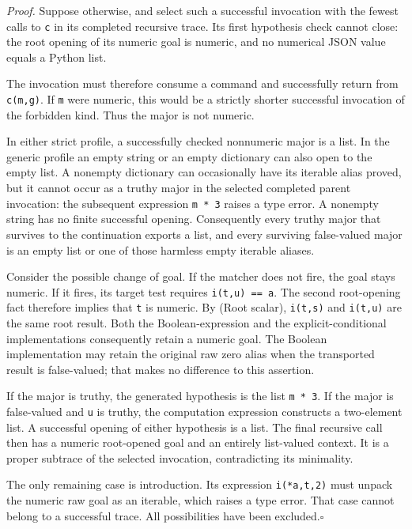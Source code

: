 \emph{Proof.}
Suppose otherwise, and select such a successful invocation with the
fewest calls to \texttt{c} in its completed recursive trace.  Its first
hypothesis check cannot close: the root opening of its numeric goal is
numeric, and no numerical JSON value equals a Python list.

The invocation must therefore consume a command and successfully return
from \texttt{c(m,g)}.  If \texttt{m} were numeric, this would be a
strictly shorter successful invocation of the forbidden kind.  Thus the
major is not numeric.

In either strict profile, a successfully checked nonnumeric major is a
list.  In the generic profile an empty string or an empty dictionary can
also open to the empty list.  A nonempty dictionary can occasionally
have its iterable alias proved, but it cannot occur as a truthy major
in the selected completed parent invocation: the subsequent expression
\texttt{m * 3} raises a type error.  A nonempty string has no finite
successful opening.  Consequently every truthy major that survives to
the continuation exports a list, and every surviving false-valued
major is an empty list or one of those harmless empty iterable aliases.

Consider the possible change of goal.  If the matcher does not fire,
the goal stays numeric.  If it fires, its target test requires
\texttt{i(t,u) == a}.  The second root-opening fact therefore implies
that \texttt{t} is numeric.  By (Root scalar), \texttt{i(t,s)} and
\texttt{i(t,u)} are the same root result.  Both the Boolean-expression
and the explicit-conditional implementations consequently retain a
numeric goal.  The Boolean implementation may retain the original raw
zero alias when the transported result is false-valued; that makes no
difference to this assertion.

If the major is truthy, the generated hypothesis is the list
\texttt{m * 3}.  If the major is false-valued and \texttt{u} is truthy,
the computation expression constructs a two-element list.  A successful
opening of either hypothesis is a list.  The final recursive call then
has a numeric root-opened goal and an entirely list-valued context.  It
is a proper subtrace of the selected invocation, contradicting its
minimality.

The only remaining case is introduction.  Its expression
\texttt{i(*a,t,2)} must unpack the numeric raw goal as an iterable,
which raises a type error.  That case cannot belong to a successful
trace.  All possibilities have been excluded.\hfill$\square$

